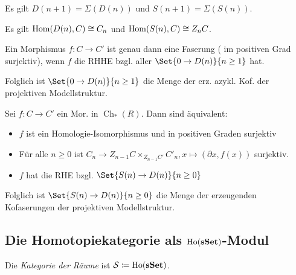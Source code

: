 \documentclass{cheat-sheet}
\DeclareMathOperator{\Ho}{Ho} %
\DeclareMathOperator{\Ch}{Ch} %
\newcommand{\Simpl}{\mathcal{S}} %
\begin{document}
\begin{bem}
  Es gilt $D(n+1) = \Sigma(D(n))$ und $S(n+1) = \Sigma(S(n))$.
\end{bem}

\begin{bem}
  Es gilt $\operatorname{Hom}(D(n), C) \cong C_n$ und $\operatorname{Hom}(S(n), C) \cong Z_n C$.
\end{bem}

\begin{lem}
  Ein Morphismus $f : C \to C'$ ist genau dann eine Faserung (\dh{} im positiven Grad surjektiv), wenn $f$ die RHHE bzgl. aller $\Set{0 \to D(n)}{n \geq 1}$ hat.
\end{lem}

\begin{bem}
  Folglich ist $\Set{0 \to D(n)}{n \geq 1}$ die Menge der erz. azykl. Kof. der projektiven Modellstruktur.
\end{bem}

\begin{lem}
  Sei $f : C \to C'$ ein Mor. in $\Ch_*(R)$.
  Dann sind äquivalent:
  \begin{itemize}
    \item $f$ ist ein Homologie-Isomorphismus und in positiven Graden surjektiv
    \item Für alle $n \geq 0$ ist $C_n \to Z_{n-1} C \times_{Z_{n-1} C'} C'_n, x \mapsto (\partial x, f(x))$ surjektiv.
    \item $f$ hat die RHE bzgl. $\Set{S(n) \to D(n)}{n \geq 0}$
  \end{itemize}
\end{lem}

\begin{bem}
  Folglich ist $\Set{S(n) \to D(n)}{n \geq 0}$ die Menge der erzeugenden Kofaserungen der projektiven Modellstruktur.
\end{bem}


\subsection{Die Homotopiekategorie als $\Ho(\sSet)$-Modul}

\begin{defn}
  Die \emph{Kategorie der Räume} ist $\Simpl \coloneqq \Ho(\sSet)$.
\end{defn}
\end{document}
